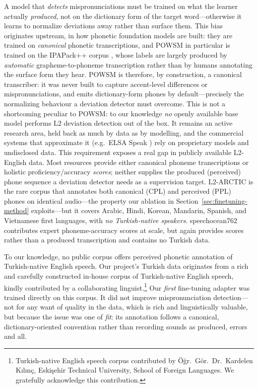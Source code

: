 \documentclass[a4paper,12pt]{report}
\begin{document}
A model that \emph{detects} mispronunciations must be trained on what the learner actually \emph{produced}, not on the dictionary form of the target word---otherwise it learns to normalize deviations away rather than surface them. This bias originates upstream, in how phonetic foundation models are built: they are trained on \emph{canonical} phonetic transcriptions, and POWSM \cite{powsm} in particular is trained on the IPAPack++ corpus \cite{zipa}, whose labels are largely produced by \emph{automatic} grapheme-to-phoneme transcription rather than by humans annotating the surface form they hear. POWSM is therefore, by construction, a canonical transcriber: it was never built to capture accent-level differences or mispronunciations, and emits dictionary-form phones by default---precisely the normalizing behaviour a deviation detector must overcome. This is not a shortcoming peculiar to POWSM: to our knowledge \emph{no} openly available base model performs L2 deviation detection out of the box. It remains an active research area, held back as much by data as by modelling, and the commercial systems that approximate it (e.g.\ ELSA Speak \cite{elsaspeak}) rely on proprietary models and undisclosed data.
This requirement exposes a real gap in publicly available L2-English data. Most resources provide either canonical phoneme transcriptions or holistic proficiency/accuracy \emph{scores}; neither supplies the produced (perceived) phone sequence a deviation detector needs as a supervision target. L2-ARCTIC \cite{l2arctic} is the rare corpus that annotates both canonical (CPL) and perceived (PPL) phones on identical audio---the property our ablation in Section~\ref{sec:finetuning-method} exploits---but it covers Arabic, Hindi, Korean, Mandarin, Spanish, and Vietnamese first languages, with \emph{no Turkish-native speakers}. speechocean762 \cite{speechocean762} contributes expert phoneme-accuracy scores at scale, but again provides scores rather than a produced transcription and contains no Turkish data.

To our knowledge, no public corpus offers perceived phonetic annotation of Turkish-native English speech. Our project's Turkish data originates from a rich and carefully constructed in-house corpus of Turkish-native English speech, kindly contributed by a collaborating linguist.\footnote{Turkish-native English speech corpus contributed by \"O\u{g}r.\ G\"or.\ Dr.\ Kardelen K\i l\i n\c{c}, Eski\c{s}ehir Technical University, School of Foreign Languages. We gratefully acknowledge this contribution.} Our \emph{first} fine-tuning adapter was trained directly on this corpus. It did not improve mispronunciation detection---not for any want of quality in the data, which is rich and linguistically valuable, but because the issue was one of \emph{fit}: its annotation follows a canonical, dictionary-oriented convention rather than recording sounds as produced, errors and all.
\end{document}
